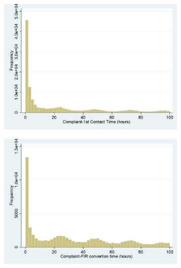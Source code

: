 \documentclass[11pt]{article}
\begin{document}
	\begin{figure}[H]
		\centering
		\caption{Estimated Effects: All Treatment Categories}
		\begin{subfigure}[b]{0.49\textwidth}
			\includegraphics[width=\textwidth]{Hist_responsetime}
			\label{fig:Hist_responsetime}
		\end{subfigure}
		\begin{subfigure}[b]{0.49\textwidth}
			\includegraphics[width=\textwidth]{Hist_timeComp2Fir}
			\label{fig:Hist_timeComp2Fir}
		\end{subfigure}
	\end{figure}
	
%
\end{document}
